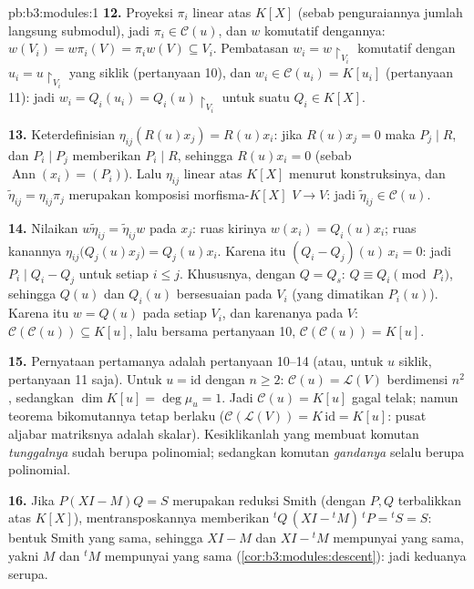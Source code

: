 \begin{solution}{pb:b3:modules:1}
\textbf{12.} Proyeksi $\pi_i$ linear atas $K[X]$ (sebab penguraiannya
jumlah langsung submodul), jadi $\pi_i \in \mathcal C(u)$, dan $w$
komutatif dengannya: $w(V_i) = w\pi_i(V) = \pi_i w(V) \subseteq
V_i$. Pembatasan $w_i = w\restriction_{V_i}$ komutatif dengan
$u_i = u\restriction_{V_i}$ yang siklik (pertanyaan 10), dan $w_i
\in \mathcal C(u_i) = K[u_i]$ (pertanyaan 11): jadi $w_i = Q_i(u_i) =
Q_i(u)\restriction_{V_i}$ untuk suatu $Q_i \in K[X]$.

\textbf{13.} Keterdefinisian $\eta_{ij}(R(u)x_j) = R(u)x_i$:
jika $R(u)x_j = 0$ maka $P_j \mid R$, dan $P_i \mid P_j$ memberikan
$P_i \mid R$, sehingga $R(u)x_i = 0$ (sebab $\operatorname{Ann}(x_i) =
(P_i)$). Lalu $\eta_{ij}$ linear atas $K[X]$ menurut konstruksinya, dan
$\tilde\eta_{ij} = \eta_{ij}\pi_j$ merupakan komposisi
morfisma-$K[X]$ $V \to V$: jadi $\tilde\eta_{ij} \in \mathcal
C(u)$.

\textbf{14.} Nilaikan $w\tilde\eta_{ij} = \tilde\eta_{ij}w$ pada $x_j$:
ruas kirinya $w(x_i) = Q_i(u)x_i$; ruas kanannya
$\eta_{ij}\bigl(Q_j(u)x_j\bigr) = Q_j(u)x_i$. Karena itu $(Q_i -
Q_j)(u)\,x_i = 0$: jadi $P_i \mid Q_i - Q_j$ untuk setiap $i \leq j$.
Khususnya, dengan $Q = Q_s$: $Q \equiv Q_i \pmod{P_i}$, sehingga $Q(u)$
dan $Q_i(u)$ bersesuaian pada $V_i$ (yang dimatikan $P_i(u)$). Karena itu $w
= Q(u)$ pada setiap $V_i$, dan karenanya pada $V$: $\mathcal C(\mathcal C(u))
\subseteq K[u]$, lalu bersama pertanyaan 10, $\mathcal C(\mathcal
C(u)) = K[u]$.

\textbf{15.} Pernyataan pertamanya adalah pertanyaan 10--14 (atau, untuk
$u$ siklik, pertanyaan 11 saja). Untuk $u = \mathrm{id}$ dengan $n \geq
2$: $\mathcal C(u) = \mathcal L(V)$ berdimensi $n^2$, sedangkan
$\dim K[u] = \deg\mu_u = 1$. Jadi $\mathcal C(u) = K[u]$ gagal
telak; namun teorema bikomutannya tetap
berlaku ($\mathcal C(\mathcal L(V)) = K\,\mathrm{id} = K[u]$: pusat
aljabar matriksnya adalah skalar). Kesiklikanlah yang
membuat komutan \emph{tunggalnya} sudah berupa polinomial; sedangkan
komutan \emph{gandanya} selalu berupa polinomial.

\textbf{16.} Jika $P(XI - M)Q = S$ merupakan reduksi Smith (dengan $P, Q$
terbalikkan atas $K[X]$), mentransposkannya memberikan ${}^tQ\,(XI -
{}^tM)\,{}^tP = {}^tS = S$: bentuk Smith yang sama, sehingga $XI - M$ dan
$XI - {}^tM$ mempunyai  yang sama, yakni $M$ dan
${}^tM$ mempunyai  yang sama
(\cref{cor:b3:modules:descent}): jadi keduanya serupa.


\end{solution}
